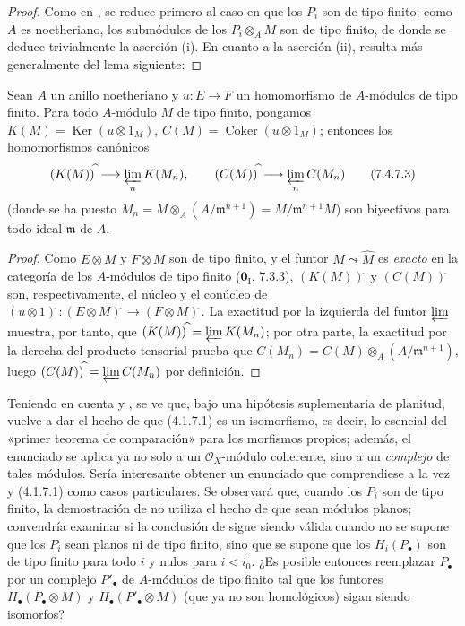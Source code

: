 \begin{proof}
Como en , se reduce primero al caso en que los $P_i$ son de
tipo finito; como $A$ es noetheriano, los submódulos de los
$P_i\otimes_A M$ son de tipo finito, de donde se deduce trivialmente la
aserción (i). En cuanto a la aserción (ii), resulta más generalmente del lema
siguiente:
\end{proof}

\begin{lemma}[7.4.7.2]
\label{III.7.4.7.2}
Sean $A$ un anillo noetheriano y $u:E\to F$ un homomorfismo de $A$-módulos de
tipo finito. Para todo $A$-módulo $M$ de tipo finito, pongamos
$K(M)=\operatorname{Ker}(u\otimes1_M)$,
$C(M)=\operatorname{Coker}(u\otimes1_M)$;
entonces los homomorfismos canónicos
\[
  (K(M))^{\widehat{\,}}\longrightarrow\varprojlim_n K(M_n),
  \qquad
  (C(M))^{\widehat{\,}}\longrightarrow\varprojlim_n C(M_n)
  \tag{7.4.7.3}\label{III.7.4.7.3.fr}
\]
(donde se ha puesto
$M_n=M\otimes_A(A/\mathfrak m^{n+1})=M/\mathfrak m^{n+1}M$) son biyectivos
para todo ideal $\mathfrak m$ de $A$.
\end{lemma}

\begin{proof}
Como $E\otimes M$ y $F\otimes M$ son de tipo finito, y el funtor
$M\leadsto\widehat M$ es \emph{exacto} en la categoría de los $A$-módulos de tipo finito
($\mathbf{0}_{\mathrm I}$, 7.3.3), $(K(M))^{\widehat{\,}}$ y $(C(M))^{\widehat{\,}}$ son,
respectivamente, el núcleo y el conúcleo de
$(u\otimes1)^{\widehat{\,}}:(E\otimes M)^{\widehat{\,}}\longrightarrow(F\otimes M)^{\widehat{\,}}$.
La exactitud por la izquierda del funtor $\varprojlim$ muestra, por tanto, que
$(K(M))^{\widehat{\,}}=\varprojlim K(M_n)$; por otra parte, la exactitud por la
derecha del producto tensorial prueba que
$C(M_n)=C(M)\otimes_A(A/\mathfrak m^{n+1})$, luego
$(C(M))^{\widehat{\,}}=\varprojlim C(M_n)$ por definición.
\end{proof}

\begin{remark}[7.4.8]
\label{III.7.4.8}
Teniendo en cuenta  y , se ve que, bajo una
hipótesis suplementaria de planitud,  vuelve a dar el hecho de
que (4.1.7.1) es un isomorfismo, es decir, lo esencial del «primer teorema de
comparación» para los morfismos propios; además, el enunciado se aplica ya no
solo a un $\mathscr O_X$-módulo coherente, sino a un \emph{complejo} de tales módulos.
Sería interesante obtener un enunciado que comprendiese a la vez
 y (4.1.7.1) como casos particulares. Se observará que, cuando los
$P_i$ son de tipo finito, la demostración de  no utiliza el
hecho de que sean módulos planos; convendría examinar si la conclusión de
 sigue siendo válida cuando no se supone que los $P_i$ sean
planos ni de tipo finito, sino que se supone que los $H_i(P_\bullet)$ son de
tipo finito para todo $i$ y nulos para $i<i_0$. ¿Es posible entonces reemplazar
$P_\bullet$ por un complejo $P'_\bullet$ de $A$-módulos de tipo finito tal que
los funtores $H_\bullet(P_\bullet\otimes M)$ y
$H_\bullet(P'_\bullet\otimes M)$ (que ya no son homológicos) sigan siendo
isomorfos?
\end{remark}

